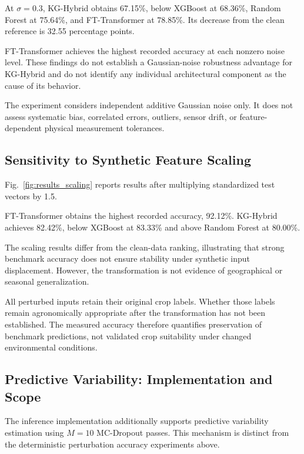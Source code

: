 At $\sigma=0.3$, KG-Hybrid obtains 67.15\%, below
XGBoost at 68.36\%, Random Forest at 75.64\%, and
FT-Transformer at 78.85\%. Its decrease from the clean
reference is 32.55 percentage points.

FT-Transformer achieves the highest recorded accuracy at each
nonzero noise level. These findings do not establish a Gaussian-noise
robustness advantage for KG-Hybrid and do not identify any
individual architectural component as the cause of its behavior.

The experiment considers independent additive Gaussian noise only.
It does not assess systematic bias, correlated errors, outliers,
sensor drift, or feature-dependent physical measurement tolerances.

\subsection{Sensitivity to Synthetic Feature Scaling}

Fig.~\ref{fig:results_scaling} reports results after multiplying
standardized test vectors by 1.5.



FT-Transformer obtains the highest recorded accuracy,
92.12\%. KG-Hybrid achieves 82.42\%, below XGBoost
at 83.33\% and above Random Forest at 80.00\%.

The scaling results differ from the clean-data ranking,
illustrating that strong benchmark accuracy does not ensure
stability under synthetic input displacement. However, the
transformation is not evidence of geographical or seasonal
generalization.

All perturbed inputs retain their original crop labels.
Whether those labels remain agronomically appropriate after
the transformation has not been established. The measured
accuracy therefore quantifies preservation of benchmark
predictions, not validated crop suitability under changed
environmental conditions.

\subsection{Predictive Variability: Implementation and Scope}

The inference implementation additionally supports predictive
variability estimation using $M=10$ MC-Dropout passes.
This mechanism is distinct from the deterministic perturbation
accuracy experiments above.

